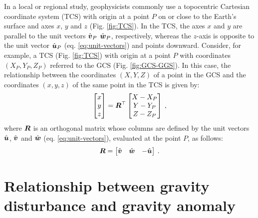 \documentclass[extra]{gji}
\begin{document}
In a local or regional study, geophysicists commonly use a topocentric 
Cartesian coordinate system (TCS) with origin at a point $P$ on or 
close to the Earth's surface and axes $x$, $y$ and $z$ (Fig. 
\ref{fig:TCS}). In the TCS, the axes $x$ and $y$ are parallel to 
the unit vectors $\hat{\mitbf{v}}_{P}$ $\hat{\mitbf{w}}_{P}$, respectively,
whereas the $z$-axis is opposite to the unit vector 
$\hat{\mitbf{u}}_{P}$ (eq. \ref{eq:unit-vectors}) and points downward.
Consider, for example, a TCS (Fig. \ref{fig:TCS}) with origin at a point $P$ with
coordinates $(X_{P}, Y_{P}, Z_{P})$ referred to the GCS (Fig. \ref{fig:GCS-GGS}).
In this case, the relationship between the coordinates $(X, Y, Z)$ of a 
point in the GCS and the coordinates $(x, y, z)$ of the same point in the 
TCS is given by:
\begin{equation}
\begin{bmatrix}
x \\
y \\
z 
\end{bmatrix} =
\mitbf{R}^{\top} \begin{bmatrix}
X - X_{P} \\
Y - Y_{P} \\
Z - Z_{P}
\end{bmatrix} \: ,
\label{eq:GCS2TCS}
\end{equation}
where $\mitbf{R}$ is an orthogonal matrix whose columns
are defined by the unit vectors $\hat{\mitbf{u}}$, $\hat{\mitbf{v}}$ and
$\hat{\mitbf{w}}$ (eq. \ref{eq:unit-vectors}), evaluated at the
point $P$, as follows:
\begin{equation}
\mitbf{R} = 
\begin{bmatrix}
\hat{\mitbf{v}} & \hat{\mitbf{w}} & -\hat{\mitbf{u}}
\end{bmatrix} \: .
\label{eq:R}
\end{equation}


\section{Relationship between gravity disturbance and gravity anomaly}
\end{document}
